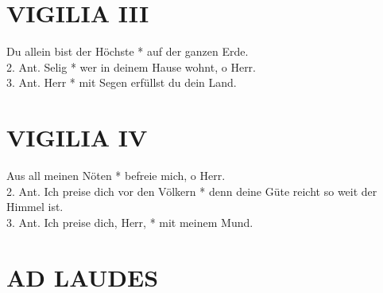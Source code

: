 \section{VIGILIA III}


\begin{sloppypar}
{ Du allein bist der Höchste * auf der ganzen Erde. \\
2. Ant. Selig * wer in deinem Hause wohnt, o Herr. \\
3. Ant. Herr * mit Segen erfüllst du dein Land.  \\}
\end{sloppypar}

\begin{flushleft}


\end{flushleft}

\section{VIGILIA IV}


\begin{sloppypar}
{ Aus all meinen Nöten * befreie mich, o Herr.  \\
2. Ant. Ich preise dich vor den Völkern * denn deine Güte reicht so weit der Himmel ist.  \\
3. Ant. Ich preise dich, Herr, * mit meinem Mund.  \\}
\end{sloppypar}

\begin{flushleft}


\end{flushleft}

\section[LAUDES]{AD LAUDES}

\def\greinitialformat#1{{\fontsize{40}{40}\selectfont #1}}
\gresetfirstlineaboveinitial{\small \textcolor{red}{ Ps 143 }}{}
\setaboveinitialseparation{0.72mm}

